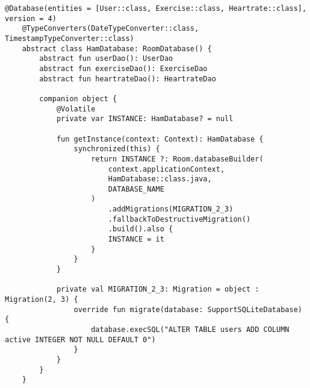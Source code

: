 \begin{lstlisting}[caption={Room Database Configuration (Kotlin)}, label={list:database_config}]
@Database(entities = [User::class, Exercise::class, Heartrate::class], version = 4)
    @TypeConverters(DateTypeConverter::class, TimestampTypeConverter::class)
    abstract class HamDatabase: RoomDatabase() {
        abstract fun userDao(): UserDao
        abstract fun exerciseDao(): ExerciseDao
        abstract fun heartrateDao(): HeartrateDao
    
        companion object {
            @Volatile
            private var INSTANCE: HamDatabase? = null
    
            fun getInstance(context: Context): HamDatabase {
                synchronized(this) {
                    return INSTANCE ?: Room.databaseBuilder(
                        context.applicationContext,
                        HamDatabase::class.java,
                        DATABASE_NAME
                    )
                        .addMigrations(MIGRATION_2_3)
                        .fallbackToDestructiveMigration()
                        .build().also {
                        INSTANCE = it
                    }
                }
            }
    
            private val MIGRATION_2_3: Migration = object : Migration(2, 3) {
                override fun migrate(database: SupportSQLiteDatabase) {
                    database.execSQL("ALTER TABLE users ADD COLUMN active INTEGER NOT NULL DEFAULT 0")
                }
            }
        }
    }
          
\end{lstlisting}